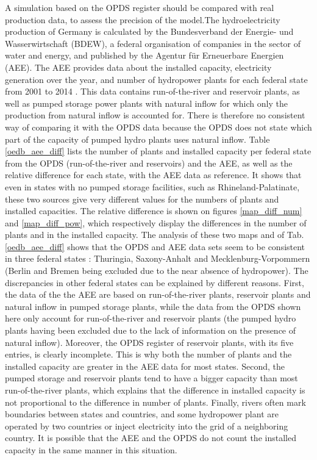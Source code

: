 A simulation based on the OPDS register should be compared with real production data, to assess the precision of the model.\newline The hydroelectricity production of Germany is calculated by the Bundesverband der Energie- und Wasserwirtschaft (BDEW), a federal organisation of companies in the sector of water and energy, and published by the Agentur für Erneuerbare Energien (AEE). The AEE provides data about the installed capacity, electricity generation over the year, and number of hydropower plants for each federal state from 2001 to 2014 \cite{aee}. This data contains run-of-the-river and reservoir plants, as well as pumped storage power plants with natural inflow for which only the production from natural inflow is accounted for. There is therefore no consistent way of comparing it with the OPDS data because the OPDS does not state which part of the capacity of pumped hydro plants uses natural inflow. \newline
Table \ref{oedb_aee_diff} lists the number of plants and installed capacity per federal state from the OPDS (run-of-the-river and reservoirs) and the AEE, as well as the relative difference for each state, with the AEE data as reference. It shows that even in states with no pumped storage facilities, such as Rhineland-Palatinate, these two sources give very different values for the numbers of plants and installed capacities. \newline
The relative difference is shown on figures \ref{map_diff_num} and \ref{map_diff_pow}, which respectively display the differences in the number of plants and in the installed capacity. The analysis of these two maps and of Tab. \ref{oedb_aee_diff} shows that the OPDS and AEE data sets seem to be consistent in three federal states : Thuringia, Saxony-Anhalt and Mecklenburg-Vorpommern (Berlin and Bremen being excluded due to the near absence of hydropower). The discrepancies in other federal states can be explained by different reasons. First, the data of the the AEE are based on run-of-the-river plants, reservoir plants and natural inflow in pumped storage plants, while the data from the OPDS shown here only account for run-of-the-river and reservoir plants (the pumped hydro plants having been excluded due to the lack of information on the presence of natural inflow). Moreover, the OPDS register of reservoir plants, with its five entries, is clearly incomplete. This is why both the number of plants and the installed capacity are greater in the AEE data for most states. Second, the pumped storage and reservoir plants tend to have a bigger capacity than most run-of-the-river plants, which explains that the difference in installed capacity is not proportional to the difference in number of plants. Finally, rivers often mark boundaries between states and countries, and some hydropower plant are operated by two countries or inject electricity into the grid of a neighboring country. It is possible that the AEE and the OPDS do not count the installed capacity in the same manner in this situation.

